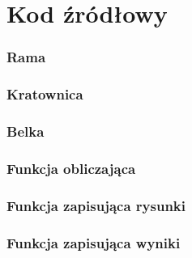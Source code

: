 \chapter{Kod źródłowy}
\subsection*{Rama}
\label{appendix:Rama}

\newpage

\subsection*{Kratownica}
\label{appendix:Kratownica}

\newpage

\subsection*{Belka}
\label{appendix:Belka}

\newpage

\subsection*{Funkcja obliczająca}
\label{appendix:Obliczenia}

\newpage

\subsection*{Funkcja zapisująca rysunki}
\label{appendix:Rysunki}

\newpage

\subsection*{Funkcja zapisująca wyniki}
\label{appendix:Results}
